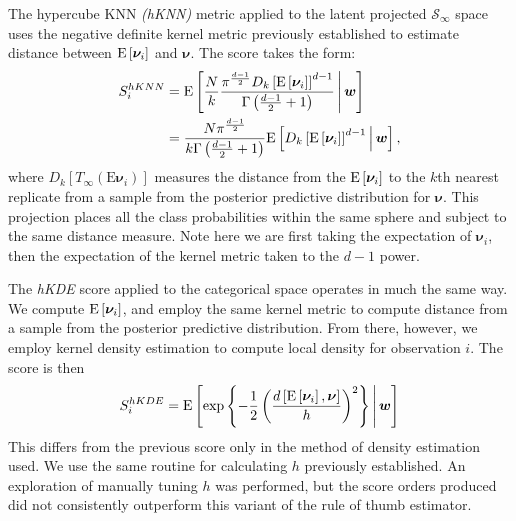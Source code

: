 The hypercube KNN \emph{(hKNN)} metric applied to the latent projected $\mathcal{S}_{\infty}$ space
  uses the negative definite kernel metric previously established to estimate distance
  between $\text{E}\left[\bm{\nu}_i\right]$ and $\bm{\nu}$.  The score takes the form:
\begin{equation}
   \label{score:cat_hknn}
   \begin{aligned}
   S_i^{hKNN} &= \text{E}\left[\frac{N}{k}
        \frac{\pi^{\frac{d-1}{2}}D_{k}\left[\text{E}\left[\bm{\nu}_i\right]\right]^{d-1}}{\Gamma\left(\frac{d-1}{2} + 1\right)}
   \,\middle\vert\,\bm{w}\right]\\
   &= \frac{N\pi^{\frac{d-1}{2}}}{k\Gamma\left(\frac{d-1}{2} + 1\right)}\text{E}\left[D_{k}\left[\text{E}\left[\bm{\nu}_i\right]\right]^{d-1}\,\middle\vert\, \bm{w}\right],
   \end{aligned}
\end{equation}
where $D_{k}\left[T_{\infty}(\text{E}\bm{\nu}_i)\right]$ measures the distance 
  from the  $\text{E}\left[\bm{\nu}_i\right]$ to the $k$th 
  nearest replicate from a sample from the posterior predictive distribution for $\bm{\nu}$.  
  This projection places all the class probabilities within the same sphere and subject to the 
  same distance measure.  Note here we are first taking the expectation of $\bm{\nu}_i$, then 
  the expectation of the kernel metric taken to the $d-1$ power.

The \emph{hKDE} score applied to the categorical space operates in much the same way.  
    We compute $\text{E}\left[\bm{\nu}_i\right]$, and employ the same kernel metric to compute 
    distance from a sample from the posterior predictive distribution.  
    From there, however, we employ kernel density estimation 
    to compute local density for observation $i$.  The score is then
\begin{equation}
    \label{score:cat_hkde}
    S_i^{hKDE} = \text{E}\left[
    \exp\left\lbrace
    -\frac{1}{2}\left(
    \frac{
    d\left[\text{E}\left[\bm{\nu}_i\right], \bm{\nu}\right]}{h}
    \right)^2
    \right\rbrace 
    \,\middle\vert\, \bm{w}\right]
\end{equation}
This differs from the previous score only in the method of density estimation used.  
    We use the same routine for calculating $h$ previously established.  An exploration 
    of manually tuning $h$ was performed, but the score orders produced did not consistently 
    outperform this variant of the rule of thumb estimator.

